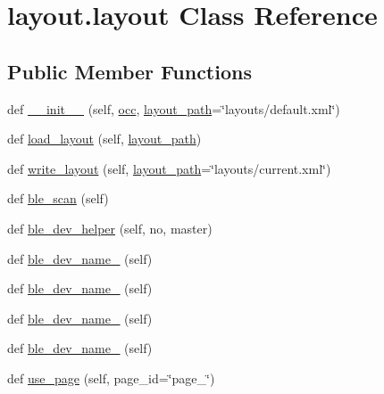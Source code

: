 \hypertarget{classlayout_1_1layout}{}\section{layout.\+layout Class Reference}
\label{classlayout_1_1layout}
\subsection*{Public Member Functions}
\begin{DoxyCompactItemize}
\item 
def \hyperlink{classlayout_1_1layout_a7e47cd5d1e93a4b4515b1fb8a30941ec}{\+\_\+\+\_\+init\+\_\+\+\_\+} (self, \hyperlink{classlayout_1_1layout_ac2fa1280be7977398ef3930c71568bdc}{occ}, \hyperlink{classlayout_1_1layout_ac7b9c2e760d1fd038ee8713760a5da73}{layout\+\_\+path}=\char`\"{}layouts/default.\+xml\char`\"{})
\item 
def \hyperlink{classlayout_1_1layout_a7275c3be35b52fa7b405994e2c999b83}{load\+\_\+layout} (self, \hyperlink{classlayout_1_1layout_ac7b9c2e760d1fd038ee8713760a5da73}{layout\+\_\+path})
\item 
def \hyperlink{classlayout_1_1layout_ad4a9522d6b342298ee823e66686ab124}{write\+\_\+layout} (self, \hyperlink{classlayout_1_1layout_ac7b9c2e760d1fd038ee8713760a5da73}{layout\+\_\+path}=\char`\"{}layouts/current.\+xml\char`\"{})
\item 
def \hyperlink{classlayout_1_1layout_a70d998b8441cf6d9931cb6fdfdc2309a}{ble\+\_\+scan} (self)
\item 
def \hyperlink{classlayout_1_1layout_a738271d751090e49ae0affb1439cd582}{ble\+\_\+dev\+\_\+helper} (self, no, master)
\item 
def \hyperlink{classlayout_1_1layout_a20c8e24a7a8656819e917c23d8e790d5}{ble\+\_\+dev\+\_\+name\+\_} (self)
\item 
def \hyperlink{classlayout_1_1layout_a70c3e0d51b1b68f6a4a059fa66af2cb8}{ble\+\_\+dev\+\_\+name\+\_} (self)
\item 
def \hyperlink{classlayout_1_1layout_a835859b89233c571315a16d4df7062f4}{ble\+\_\+dev\+\_\+name\+\_} (self)
\item 
def \hyperlink{classlayout_1_1layout_a7d58e5dcfe0415b65397d085427846c7}{ble\+\_\+dev\+\_\+name\+\_} (self)
\item 
def \hyperlink{classlayout_1_1layout_af9d992ec7a77a1f8975d42e474085607}{use\+\_\+page} (self, page\+\_\+id=\char`\"{}page\+\_\char`\"{})
\item 

\end{DoxyCompactItemize}
